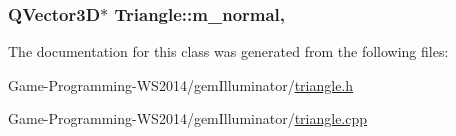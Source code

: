 \subsubsection[{m\+\_\+normal}]{\setlength{\rightskip}{0pt plus 5cm}Q\+Vector3\+D$\ast$ Triangle\+::m\+\_\+normal\hspace{0.3cm}{\ttfamily [mutable]}, {\ttfamily [protected]}}\label{class_triangle_a86922a6a07e847f2df3b9310af273d8a}


The documentation for this class was generated from the following files\+:\begin{DoxyCompactItemize}
\item 
Game-\/\+Programming-\/\+W\+S2014/gem\+Illuminator/\hyperlink{triangle_8h}{triangle.\+h}\item 
Game-\/\+Programming-\/\+W\+S2014/gem\+Illuminator/\hyperlink{triangle_8cpp}{triangle.\+cpp}\end{DoxyCompactItemize}
